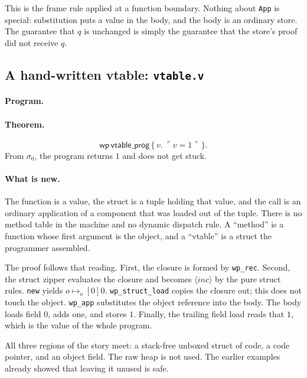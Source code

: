 \documentclass[11pt]{article}
\newcommand{\ptso}{\mathrel{\mapsto_{o}}}
\newcommand{\Wpre}{\mathsf{wp}}
\newcommand{\pure}[1]{\ulcorner #1 \urcorner}
\begin{document}
This is the frame rule applied at a function boundary.
Nothing about \texttt{App} is special: substitution puts a value in the body, and the body is an ordinary store.
The guarantee that \(q\) is unchanged is simply the guarantee that the store's proof did not receive \(q\).

\subsection{A hand-written vtable: \texttt{vtable.v}}

\paragraph{Program.}\mbox{}\par


\paragraph{Theorem.}
\[
\Wpre\,\mathsf{vtable\_prog}\,\{\,v.\; \pure{v=1}\,\}.
\]
From \(\sigma_0\), the program returns \(1\) and does not get stuck.

\paragraph{What is new.}
The function is a value, the struct is a tuple holding that value, and the call is an ordinary application of a component that was loaded out of the tuple.
There is no method table in the machine and no dynamic dispatch rule.
A ``method'' is a function whose first argument is the object, and a ``vtable'' is a struct the programmer assembled.

The proof follows that reading.
First, the closure is formed by \texttt{wp\_rec}.
Second, the struct zipper evaluates the closure and becomes \(\langle \mathit{inc}\rangle\) by the pure struct rules.
\texttt{new} yields \(o \ptso[0] 0\).
\texttt{wp\_struct\_load} copies the closure out; this does not touch the object.
\texttt{wp\_app} substitutes the object reference into the body.
The body loads field \(0\), adds one, and stores \(1\).
Finally, the trailing field load reads that \(1\), which is the value of the whole program.

All three regions of the story meet: a stack-free unboxed struct of code, a code pointer, and an object field.
The raw heap is not used.
The earlier examples already showed that leaving it unused is safe.
\end{document}
